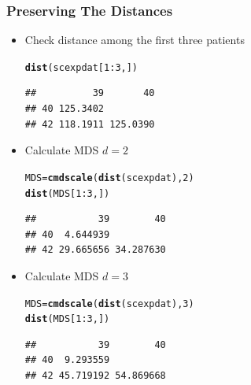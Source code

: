 \documentclass[xcolor=x11names,compress]{beamer}\usepackage[]{graphicx}\usepackage[]{color}
\makeatletter
\newcommand{\hlnum}[1]{\textcolor[rgb]{0.686,0.059,0.569}{#1}}%
\newcommand{\hlopt}[1]{\textcolor[rgb]{0,0,0}{#1}}%
\newcommand{\hlstd}[1]{\textcolor[rgb]{0.345,0.345,0.345}{#1}}%
\newcommand{\hlkwb}[1]{\textcolor[rgb]{0.69,0.353,0.396}{#1}}%
\newcommand{\hlkwd}[1]{\textcolor[rgb]{0.737,0.353,0.396}{\textbf{#1}}}%
\newenvironment{kframe}{%
 \def\at@end@of@kframe{}%
 \ifinner\ifhmode%
  \def\at@end@of@kframe{\end{minipage}}%
  \begin{minipage}{\columnwidth}%
 \fi\fi%
 \def\FrameCommand##1{\hskip\@totalleftmargin \hskip-\fboxsep
 \colorbox{shadecolor}{##1}\hskip-\fboxsep
     \hskip-\linewidth \hskip-\@totalleftmargin \hskip\columnwidth}%
 \MakeFramed {\advance\hsize-\width
   \@totalleftmargin\z@ \linewidth\hsize
   \@setminipage}}%
 {\par\unskip\endMakeFramed%
 \at@end@of@kframe}
\newenvironment{knitrout}{}{} %
\makeatother
\begin{document}
\begin{frame}[containsverbatim]
  \frametitle{Preserving The Distances}
\footnotesize
  \begin{itemize}
\item Check distance among the first three patients
\begin{knitrout}\tiny
{}\color{fgcolor}\begin{kframe}
\begin{alltt}
\hlkwd{dist}\hlstd{(scexpdat[}\hlnum{1}\hlopt{:}\hlnum{3}\hlstd{,])}
\end{alltt}
\begin{verbatim}
##          39       40
## 40 125.3402         
## 42 118.1911 125.0390
\end{verbatim}
\end{kframe}
\end{knitrout}
\item Calculate MDS $d=2$
\begin{knitrout}\tiny
{}\color{fgcolor}\begin{kframe}
\begin{alltt}
\hlstd{MDS}\hlkwb{=}\hlkwd{cmdscale}\hlstd{(}\hlkwd{dist}\hlstd{(scexpdat),}\hlnum{2}\hlstd{)}
\hlkwd{dist}\hlstd{(MDS[}\hlnum{1}\hlopt{:}\hlnum{3}\hlstd{,])}
\end{alltt}
\begin{verbatim}
##           39        40
## 40  4.644939          
## 42 29.665656 34.287630
\end{verbatim}
\end{kframe}
\end{knitrout}
\item Calculate MDS $d=3$
\begin{knitrout}\tiny
{}\color{fgcolor}\begin{kframe}
\begin{alltt}
\hlstd{MDS}\hlkwb{=}\hlkwd{cmdscale}\hlstd{(}\hlkwd{dist}\hlstd{(scexpdat),}\hlnum{3}\hlstd{)}
\hlkwd{dist}\hlstd{(MDS[}\hlnum{1}\hlopt{:}\hlnum{3}\hlstd{,])}
\end{alltt}
\begin{verbatim}
##           39        40
## 40  9.293559          
## 42 45.719192 54.869668
\end{verbatim}
\end{kframe}
\end{knitrout}

  \end{itemize}
\end{frame}
\end{document}
